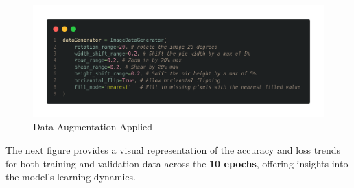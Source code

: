 \begin{figure}[H]
    \centering
    \includegraphics[width=1\linewidth]{images/modelo_aulas_dataaug.png}
    \caption{Data Augmentation Applied}
    \label{fig:enter-label}
\end{figure}

The next figure provides a visual representation of the accuracy and loss trends for both training and validation data across the \textbf{10 epochs}, offering insights into the model's learning dynamics.


